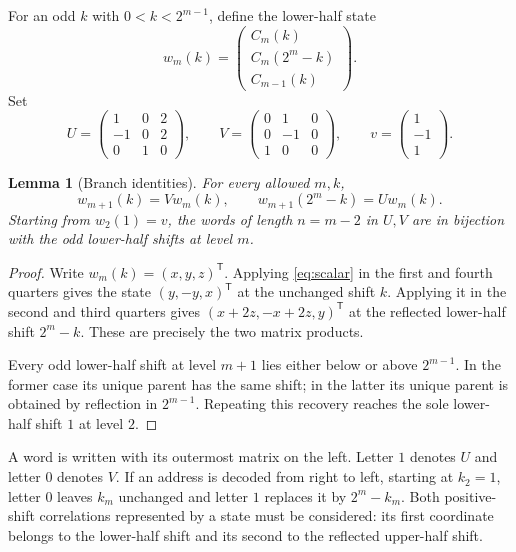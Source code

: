 \documentclass[11pt,a4paper]{article}
\newtheorem{lemma}[theorem]{Lemma}
\theoremstyle{definition}\newtheorem{definition}[theorem]{Definition}
\theoremstyle{remark}\newtheorem{remark}[theorem]{Remark}
\newcommand{\tr}{\mathsf T}
\newcommand{\vv}{\begin{pmatrix}1\\-1\\1\end{pmatrix}}
\newcommand{\state}[3]{\begin{pmatrix}#1\\#2\\#3\end{pmatrix}}
\begin{document}
For an odd $k$ with $0<k<2^{m-1}$, define the lower-half state
\begin{equation}
 w_m(k)=\state{C_m(k)}{C_m(2^m-k)}{C_{m-1}(k)}.
 \label{eq:state}
\end{equation}
Set
\begin{equation}
 U=\begin{pmatrix}1&0&2\\-1&0&2\\0&1&0\end{pmatrix},\qquad
 V=\begin{pmatrix}0&1&0\\0&-1&0\\1&0&0\end{pmatrix},\qquad
 v=\vv.
 \label{eq:matrices}
\end{equation}

\begin{lemma}[Branch identities]
\label{lem:branches}
For every allowed $m,k$,
\begin{equation}
 w_{m+1}(k)=Vw_m(k),\qquad
 w_{m+1}(2^m-k)=Uw_m(k).
 \label{eq:branches}
\end{equation}
Starting from $w_2(1)=v$, the words of length $n=m-2$ in $U,V$ are in
bijection with the odd lower-half shifts at level $m$.
\end{lemma}

\begin{proof}
Write $w_m(k)=(x,y,z)^\tr$. Applying \eqref{eq:scalar} in the first and
fourth quarters gives the state $(y,-y,x)^\tr$ at the unchanged shift $k$.
Applying it in the second and third quarters gives
$(x+2z,-x+2z,y)^\tr$ at the reflected lower-half shift $2^m-k$.
These are precisely the two matrix products.

Every odd lower-half shift at level $m+1$ lies either below or above
$2^{m-1}$. In the former case its unique parent has the same shift; in the
latter its unique parent is obtained by reflection in $2^{m-1}$. Repeating
this recovery reaches the sole lower-half shift $1$ at level $2$.
\end{proof}

A word is written with its outermost matrix on the left. Letter $1$ denotes
$U$ and letter $0$ denotes $V$. If an address is decoded from right to left,
starting at $k_2=1$, letter $0$ leaves $k_m$ unchanged and letter $1$ replaces
it by $2^m-k_m$.
Both positive-shift correlations represented by a state must be considered:
its first coordinate belongs to the lower-half shift and its second to the
reflected upper-half shift.
\end{document}
